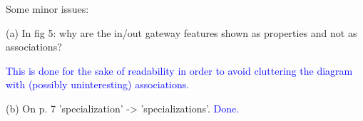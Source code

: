 \documentclass[10pt]{article}
\begin{document}
\begin{response}{Some minor issues:

(a) In fig 5: why are the in/out gateway features shown as properties and not as associations? 

\textcolor{blue}{This is done for the sake of readability in order to avoid cluttering the diagram with (possibly uninteresting) associations.}

(b) On p. 7 'specialization' -> 'specializations'. \textcolor{blue}{Done.}} 
\end{response}
\end{document}
